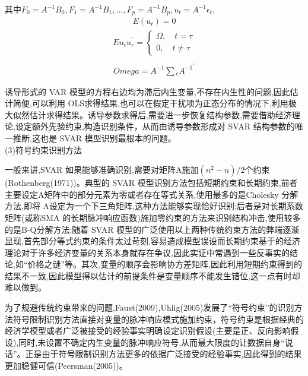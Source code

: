 \documentclass{ijclclp}
\begin{document}
其中$F_0=A^{-1}B_0,F_1=A^{-1}B_1,\dots ,F_p=A^{-1}B_p,u_t=A^{-1} \epsilon_t.$
\begin{equation}
\begin{aligned}
E(u_t)=0
\end{aligned}
\tag{6}
\end{equation}
\begin{equation}
\begin{aligned}
Eu_tu^{'}_r=\left\{ \begin{aligned} 
\Omega,\quad t= \tau\\
0,\quad t\neq\tau
\end{aligned} \right.
\end{aligned}
\tag{7}
\end{equation}
\begin{equation}
\begin{aligned}
\\Omega=A^{-1}\sum{}_{\epsilon}{A^{-1}}^'
\end{aligned}
\tag{8}
\end{equation}

诱导形式的 VAR 模型的方程右边均为滞后内生变量,不存在内生性的问题,因此估计简便,可以利用 OLS求得结果,也可以在假定干扰项为正态分布的情况下,利用极大似然估计求得结果。诱导参数求得后,需要进一步恢复结构参数,需要借助经济理论,设定额外先验约束,构造识别条件，从而由诱导参数形成对 SVAR 结构参数的唯一推断,这也是 SVAR 模型识别最根本的问题。\\
(3)符号约束识别方法

一般来讲,SVAR 如果能够准确识别,需要对矩阵A施加$(n^2-n)/2$个约束(Rothenberg(1971))。典型的 SVAR 模型识别方法包括短期约束和长期约束,前者主要设定A矩阵中的部分元素为零或者存在等式关系,使用最多的是Cholesky 分解方法,即将 A设定为一个下三角矩阵,这种方法能够实现恰好识别;后者是对长期系数矩阵(或称SMA 的长期脉冲响应函数)施加零约束的方法来识别结构冲击,使用较多的是B-Q分解方法:随着 SVAR 模型的广泛使用以上两种传统约束方法的弊端逐渐显现,首先部分等式约束的条件太过苛刻,容易造成模型误设而长期约束基于的经济理论对于许多经济变量的关系本身就存在争议,因此实证中常遇到一些反事实的结论,如“价格之谜”等。其次,变量的顺序会影响协方差矩阵,因此利用短期约束得到的结果不一致,因此模型得以估计的前提条件是变量顺序不能发生错位,这一点有时却难以做到。

为了规避传统约束带来的问题,Faust(2009),Uhlig(2005)发展了“符号约束”的识别方法符号限制识别方法直接对变量的脉冲响应模式施加约束，符号约束是根据经典的经济学模型或者广泛被接受的经验事实明确设定识别假设(主要是正、反向影响假设),同时,未设置不确定内生变量的脉冲响应符号,从而最大限度的让数据自身“说话”。正是由于符号限制识别方法更多的依据广泛接受的经验事实,因此得到的结果更加稳健可信(Peersman(2005))。
\end{document}
